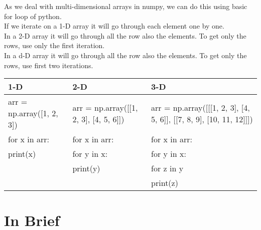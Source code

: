 \documentclass[openany]{book}
\begin{document}
As we deal with multi-dimensional arrays in numpy, we can do this using basic for loop of python. \\

If we iterate on a 1-D array it will go through each element one by one.\\

In a 2-D array it will go through all the row also the elements. To get only the rows, use only the first iteration. \\

In a d-D array it will go through all the row also the elements. To get only the rows, use  first two iterations.


\begin{tabular}{|p{4cm}|p{6cm}|p{8.5cm}|}
    \hline
    1-D & 2-D & 3-D \\
    \hline
arr = np.array([1, 2, 3]) &  arr = np.array([[1, 2, 3], [4, 5, 6]]) &     arr = np.array([[[1, 2, 3], [4, 5, 6]], [[7, 8, 9], [10, 11, 12]]]) \\
for x in arr: & for x in arr: & for x in arr:\\
print(x) & for y in x: & for y in x: \\
& print(y) & for z in y \\
& & print(z) \\
\hline
\end{tabular}

\chapter{In Brief}
\end{document}
